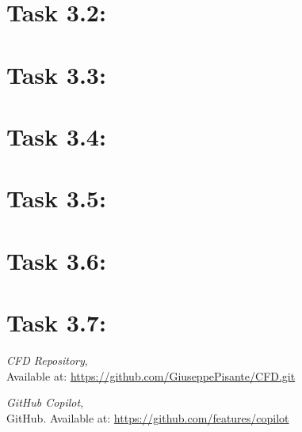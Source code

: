 \documentclass{article}
\begin{document}
\section*{\Large Task 3.2:}
\section*{\Large Task 3.3:}
\section*{\Large Task 3.4:}
\section*{\Large Task 3.5:}
\section*{\Large Task 3.6:}
\section*{\Large Task 3.7:}

\begin{thebibliography}{9}
    \textit{CFD Repository},\\
    Available at: \url{https://github.com/GiuseppePisante/CFD.git}
    
    \textit{GitHub Copilot},\\
    GitHub. Available at: \url{https://github.com/features/copilot}
    \end{thebibliography}
\end{document}
